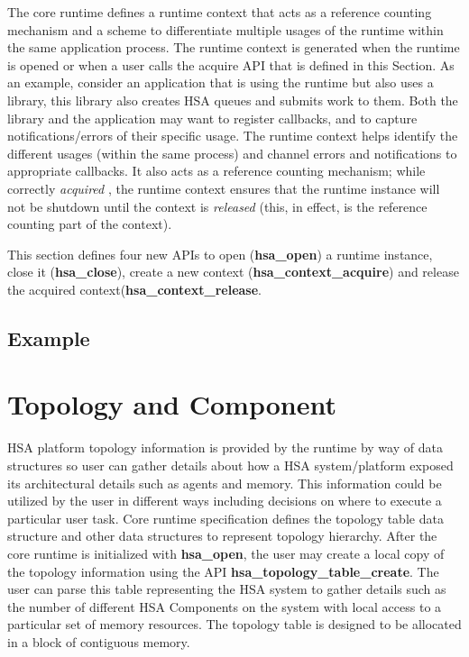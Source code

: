 \documentclass{book}
\newcommand{\emphld}[1]{\begin{DIFnomarkup} \emph{#1} \end{DIFnomarkup}}
\newcommand{\reffun}[1]{\textbf{#1}}
\newenvironment{DIFnomarkup}{}{}
\begin{document}
The core runtime defines a runtime context that acts as a reference
counting mechanism and a scheme to differentiate multiple usages of
the runtime within the same application process. The runtime context
is generated when the runtime is opened or when a
user calls the acquire API that is defined in this Section. As an
example, consider an application that is using the runtime but also
uses a library, this library also creates HSA queues and submits
work to them. Both the library and the application may want to register
callbacks, and to capture notifications/errors of their specific
usage. The runtime context helps identify the different usages (within
the same process) and channel errors and notifications to
appropriate callbacks. It also acts as a reference counting
mechanism; while correctly \emphld{acquired}, the runtime context
ensures that the runtime instance will not be shutdown until the
context is \emphld{released} (this, in effect, is the reference
counting part of the context).

This section defines four new APIs to open (\reffun{hsa\_open}) a
runtime instance, close it (\reffun{hsa\_close}), create a new context
(\reffun{hsa\_context\_acquire}) and release the acquired
context(\reffun{hsa\_context\_release}.



\subsection{Example}


 \hypertarget{component}{}\section{Topology and Component
}\label{topology} HSA platform topology information is provided by the
runtime by way of data structures so user can gather details about how
a HSA system/platform exposed its architectural details such as agents
and memory. This information could be utilized by the user in
different ways including decisions on where to execute a particular
user task. Core runtime specification defines the topology table data
structure and other data structures to represent topology hierarchy.
After the core runtime is initialized with \reffun{hsa\_open}, the user
may create a local copy of the topology information using the API
\reffun{hsa\_topology\_table\_create}. The user can parse this table
representing the HSA system to gather details such as the number of
different HSA Components on the system with local access to a
particular set of memory resources. The topology table is designed to
be allocated in a block of contiguous memory.
\end{document}
